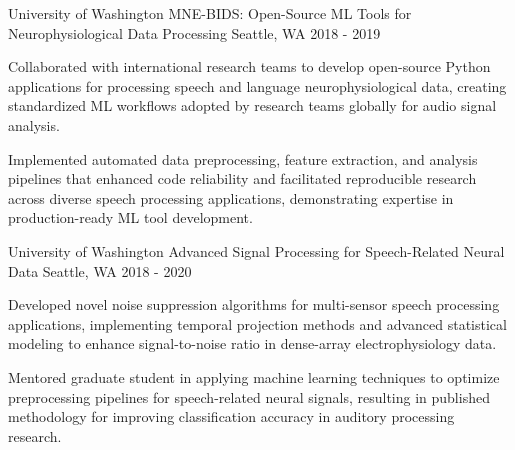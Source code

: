 \begin{cventries}
    \cventry
      {University of Washington} %
      {MNE-BIDS: Open-Source ML Tools for Neurophysiological Data Processing} %
      {Seattle, WA} %
      {2018 - 2019} %
      {
        \begin{cvitems} %
          \item {Collaborated with international research teams to develop open-source Python applications for processing speech and language neurophysiological data, creating standardized ML workflows adopted by research teams globally for audio signal analysis.}
          \item {Implemented automated data preprocessing, feature extraction, and analysis pipelines that enhanced code reliability and facilitated reproducible research across diverse speech processing applications, demonstrating expertise in production-ready ML tool development.}
        \end{cvitems}
      }

    \cventry
      {University of Washington} %
      {Advanced Signal Processing for Speech-Related Neural Data} %
      {Seattle, WA} %
      {2018 - 2020} %
      {
        \begin{cvitems} %
          \item {Developed novel noise suppression algorithms for multi-sensor speech processing applications, implementing temporal projection methods and advanced statistical modeling to enhance signal-to-noise ratio in dense-array electrophysiology data.}
          \item {Mentored graduate student in applying machine learning techniques to optimize preprocessing pipelines for speech-related neural signals, resulting in published methodology for improving classification accuracy in auditory processing research.}
        \end{cvitems}
      }


\end{cventries}
